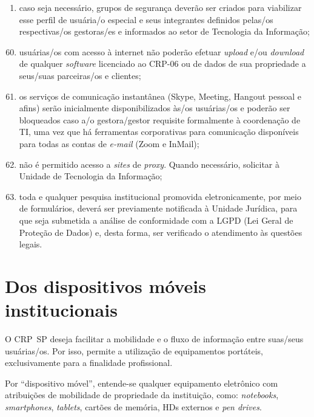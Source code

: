 \documentclass[openright, twoside, a4paper]{memoir}
\begin{document}
\begin{enumerate}
\def\labelenumi{\roman{enumi}.}
\item
    caso seja necessário, grupos de segurança deverão ser criados para
    viabilizar esse perfil de usuária/o especial e seus integrantes
    definidos pelas/os respectivas/os gestoras/es e informados ao setor de
    Tecnologia da Informação;
\end{enumerate}

\begin{enumerate}

\setcounter{enumi}{59}
\item
    usuárias/os com acesso à internet não poderão efetuar \emph{upload}
    e/ou \emph{download} de qualquer \emph{software} licenciado ao CRP-06
    ou de dados de sua propriedade a seus/suas parceiras/os e clientes;
\item
    os serviços de comunicação instantânea (Skype, Meeting, Hangout
    pessoal e afins) serão inicialmente disponibilizados às/os usuárias/os
    e poderão ser bloqueados caso a/o gestora/gestor requisite formalmente
    à coordenação de TI, uma vez que há ferramentas corporativas para
    comunicação disponíveis para todas as contas de \emph{e-mail} (Zoom e
    InMail);
\item
    não é permitido acesso a \emph{sites} de \emph{proxy}. Quando
    necessário, solicitar à Unidade de Tecnologia da Informação;
\item
    toda e qualquer pesquisa institucional promovida eletronicamente, por
    meio de formulários, deverá ser previamente notificada à Unidade
    Jurídica, para que seja submetida a análise de conformidade com a LGPD
    (Lei Geral de Proteção de Dados) e, desta forma, ser verificado o
    atendimento às questões legais.
\end{enumerate}

\clearpage
\chapter{Dos dispositivos móveis
institucionais}

O CRP~SP deseja facilitar a mobilidade e o fluxo de informação entre
suas/seus usuárias/os. Por isso, permite a utilização de equipamentos
portáteis, exclusivamente para a finalidade profissional.

Por ``dispositivo móvel'', entende-se qualquer equipamento eletrônico
com atribuições de mobilidade de propriedade da instituição, como:
\emph{notebooks}, \emph{smartphones}, \emph{tablets}, cartões de
memória, HDs externos e \emph{pen drives}.
\end{document}
